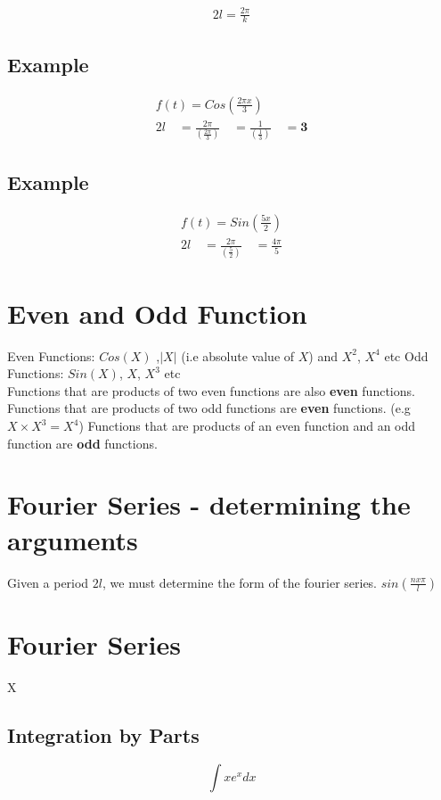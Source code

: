 \documentclass[12pt, a4paper]{article}
\begin{document}
\begin{eqnarray}
2l = \frac{2 \pi}{k}\nonumber
\end{eqnarray}


\subsection{Example}
\begin{eqnarray}f(t) = Cos(\frac{2 \pi x}{3}) \nonumber\\
2l \quad=\frac{2\pi}{(\frac{2\pi}{3})}\quad =
\frac{1}{(\frac{1}{3})}\quad= \textbf{3}\nonumber
\end{eqnarray}

\subsection{Example}
\begin{eqnarray}f(t) = Sin(\frac{5x}{2}) \nonumber\\
2l \quad=\frac{2\pi}{(\frac{5}{2})}\quad = \frac{4\pi}{5}\nonumber
\end{eqnarray}

\section{Even and Odd Function}
Even Functions: $Cos(X)$ ,$|X|$ (i.e absolute value of $X$) and
$X^2$, $X^4$ etc
\newline
Odd Functions: $Sin(X)$, $X$, $X^3$ etc
\\
Functions that are products of two even functions are also
\textbf{even} functions.
\newline
Functions that are products of two odd functions are
\textbf{even} functions. (e.g $X \times X^3 = X^4$)
\newline
Functions that are products of an even function and an
odd function are \textbf{odd} functions.
\section{Fourier Series - determining the arguments}
Given a period $2l$, we must determine the form of the fourier
series. $sin( \frac{n x \pi}{l})$
\section{Fourier Series}
X

\subsection*{Integration by Parts}
\[ \int xe^xdx \]
\end{document}
